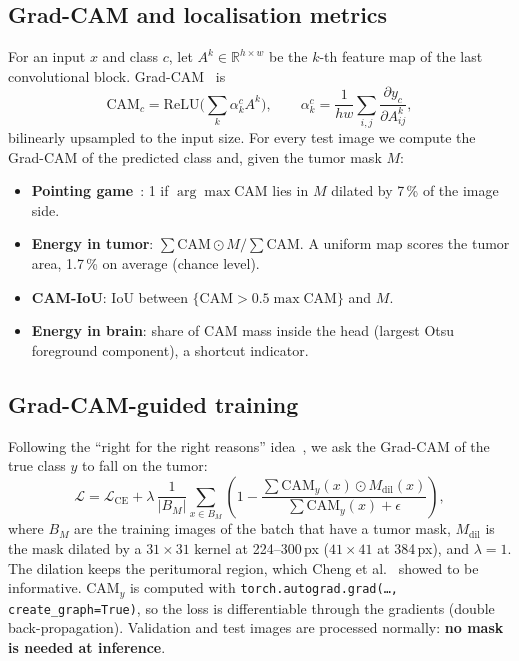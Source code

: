 \documentclass[11pt,a4paper]{article}
\begin{document}
\subsection{Grad-CAM and localisation metrics}\label{sec:gcmetrics}
For an input $x$ and class $c$, let $A^k\in\mathbb{R}^{h\times w}$ be the $k$-th feature map of the last convolutional
block. Grad-CAM~\cite{gradcam} is
\begin{equation}
  \mathrm{CAM}_c = \mathrm{ReLU}\Big(\sum_k \alpha_k^c A^k\Big),\qquad
  \alpha_k^c = \frac{1}{hw}\sum_{i,j}\frac{\partial y_c}{\partial A^k_{ij}},
\end{equation}
bilinearly upsampled to the input size. For every test image we compute the Grad-CAM of the predicted class and, given
the tumor mask $M$:
\begin{itemize}
  \item \textbf{Pointing game}~\cite{pointinggame}: 1 if $\arg\max\mathrm{CAM}$ lies in $M$ dilated by 7\,\% of the image side.
  \item \textbf{Energy in tumor}: $\sum\mathrm{CAM}\odot M/\sum\mathrm{CAM}$. A uniform map scores the tumor area,
        1.7\,\% on average (chance level).
  \item \textbf{CAM-IoU}: IoU between $\{\mathrm{CAM}>0.5\max\mathrm{CAM}\}$ and $M$.
  \item \textbf{Energy in brain}: share of CAM mass inside the head (largest Otsu foreground component), a shortcut indicator.
\end{itemize}

\subsection{Grad-CAM-guided training}\label{sec:guidedloss}
Following the ``right for the right reasons'' idea~\cite{ross2017}, we ask the Grad-CAM of the true class $y$ to fall
on the tumor:
\begin{equation}
  \mathcal{L} = \mathcal{L}_{\mathrm{CE}} + \lambda\,\frac{1}{|B_M|}\sum_{x\in B_M}
  \left(1-\frac{\sum \mathrm{CAM}_y(x)\odot M_{\mathrm{dil}}(x)}{\sum \mathrm{CAM}_y(x)+\epsilon}\right),
  \label{eq:guided}
\end{equation}
where $B_M$ are the training images of the batch that have a tumor mask, $M_{\mathrm{dil}}$ is the mask dilated by a
$31\times31$ kernel at 224--300\,px ($41\times41$ at 384\,px), and $\lambda=1$. The dilation keeps the peritumoral
region, which Cheng et al.~\cite{cheng2015} showed to be informative. $\mathrm{CAM}_y$ is computed with
\texttt{torch.autograd.grad(\dots, create\_graph=True)}, so the loss is differentiable through the gradients
(double back-propagation). Validation and test images are processed normally: \textbf{no mask is needed at inference}.
\end{document}

